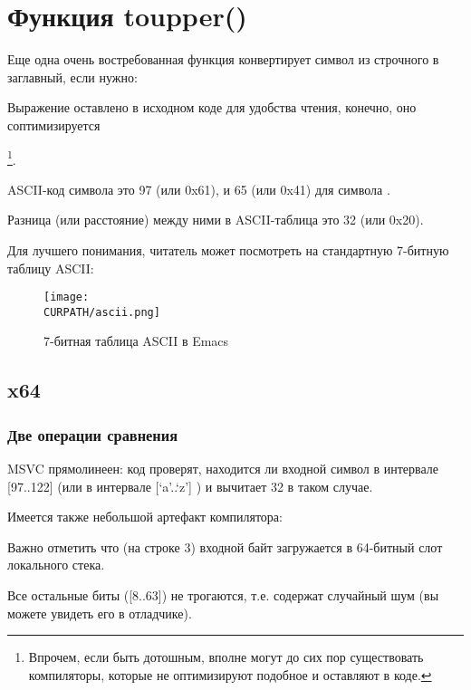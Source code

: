 \section{Функция toupper()}

Еще одна очень востребованная функция конвертирует символ из строчного в заглавный, если нужно:



Выражение  оставлено в исходном коде для удобства чтения, 
конечно, оно соптимизируется

\footnote{Впрочем, если быть дотошным, вполне могут до сих пор существовать компиляторы,
которые не оптимизируют подобное и оставляют в коде.}.

\ac{ASCII}-код символа  это 97 (или 0x61), и 65 (или 0x41) для символа .

Разница (или расстояние) между ними в \ac{ASCII}-таблица это 32 (или 0x20).

Для лучшего понимания, читатель может посмотреть на стандартную 7-битную таблицу \ac{ASCII}:

\begin{figure}[H]
\centering
\texttt{[image: \\CURPATH/ascii.png]}
\caption{7-битная таблица \ac{ASCII} в Emacs}
\end{figure}

\subsection{x64}

\subsubsection{Две операции сравнения}

\NonOptimizing MSVC прямолинеен: код проверят, находится ли входной символ в интервале [97..122]
(или в интервале [`a'..`z'] ) и вычитает 32 в таком случае.

Имеется также небольшой артефакт компилятора:



Важно отметить что (на строке 3) входной байт загружается в 64-битный слот локального стека.

Все остальные биты ([8..63]) не трогаются, т.е. содержат случайный шум (вы можете увидеть его в отладчике).

